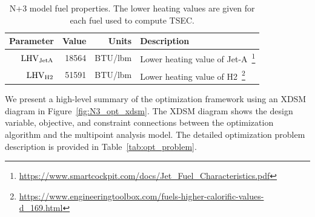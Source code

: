 \documentclass[conf]{new-aiaa}
\begin{document}
\begin{table}[hbt!]
  \centering
  \caption{
    N+3 model fuel properties.
    The lower heating values are given for each fuel used to compute TSEC.}
  \begin{tabular}{r r r l}
    \hline
    Parameter              & Value & Units        & Description                                                                                                            \\
    \hline
    $\rm{LHV}_{\rm{JetA}}$ & 18564 & \si{BTU/lbm} & Lower heating value of Jet-A~\footnote{\url{https://www.smartcockpit.com/docs/Jet_Fuel_Characteristics.pdf}}           \\
    $\rm{LHV}_{\rm{H2}}$   & 51591 & \si{BTU/lbm} & Lower heating value of H2~\footnote{\url{https://www.engineeringtoolbox.com/fuels-higher-calorific-values-d_169.html}} \\
    \hline
  \end{tabular}
  \label{fuel_props}
\end{table}

We present a high-level summary of the optimization framework using an XDSM diagram in Figure~\ref{fig:N3_opt_xdsm}.
The XDSM diagram shows the design variable, objective, and constraint connections between the optimization algorithm and the multipoint analysis model.
The detailed optimization problem description is provided in Table~\ref{tab:opt_problem}.
\end{document}
